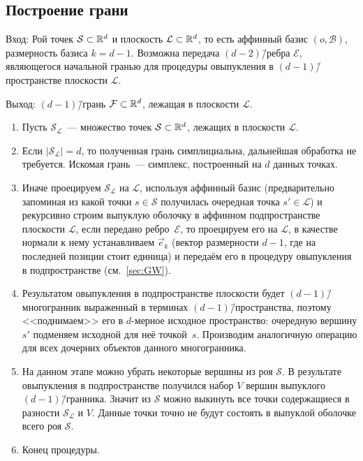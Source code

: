 \documentclass[a4paper,12pt]{article}
\newcommand{\R}[1][]{%
  \ifthenelse{\equal{#1}{}}%
  {\mathbb{R}}%
  {\mathbb{R}^{#1}}}
\newcommand{\Swarm}{\mathcal{S}}              %
\newcommand{\Facet}{\mathcal{F}}              %
\newcommand{\Edge}{\mathcal{E}}               %
\newcommand{\Basis}{\mathcal{B}}              %
\newcommand{\Plane}{\mathcal{L}}           %
\renewcommand{\.}{\hspace{0.2ex}}
\begin{document}
  \subsection{Построение грани}
    \label{FacetConstruction}

    Вход: Рой точек $\Swarm \subset \R[d]$ и плоскость $\Plane \subset \R[d]$, то есть аффинный базис $(o, \Basis)$, размерность базиса $k = d - 1$. Возможна передача $(d-2)$\=/ребра $\Edge$, являющегося начальной гранью для процедуры овыпукления в $(d-1)$\=/пространстве плоскости $\Plane$.

    Выход: $(d-1)$\=/грань $\Facet \subset \R[d]$, лежащая в плоскости $\Plane$.

    \begin{enumerate}
      \item Пусть $\Swarm_\Plane$~--- множество точек $\Swarm \subset \R[d]$, лежащих в плоскости $\Plane$.


      \item Если $|\Swarm_\Plane| = d$, то полученная грань симплициальна, дальнейшая обработка не требуется. Искомая грань~--- симплекс, построенный на $d$ данных точках.


      \item Иначе проецируем $\Swarm_\Plane$ на $\Plane$, используя аффинный базис (предварительно запоминая из какой точки $s \in \Swarm$ получилась очередная точка $s' \in \Plane$) и рекурсивно строим выпуклую оболочку в аффинном подпространстве плоскости $\Plane$, если передано ребро~$\Edge$, то проецируем его на $\Plane$, в качестве нормали к нему устанавливаем $\vec e_k$ (вектор размерности $d-1$, где на последней позиции стоит единица) и передаём его в процедуру овыпукления в подпространстве (см.~\ref{sec:GW}).


      \item Результатом овыпукления в подпространстве плоскости будет $(d-1)$\=/многогранник выраженный в терминах $(d-1)$\=/пространства, поэтому <<поднимаем>> его в $d$-мерное исходное пространство: очередную вершину $s'$ подменяем исходной для неё точкой~$s$. Производим аналогичную операцию для всех дочерних объектов данного многогранника.


      \item На данном этапе можно убрать некоторые вершины из роя $\Swarm$. В результате овыпукления в подпространстве получился набор $V$ вершин выпуклого $(d-1)$\=/гранника. Значит из $\Swarm$ можно выкинуть все точки содержащиеся в разности $\Swarm_\Plane$ и $V$. Данные точки точно не будут состоять в выпуклой оболочке всего роя $\Swarm$.


      \item Конец процедуры.
    \end{enumerate}
\end{document}
